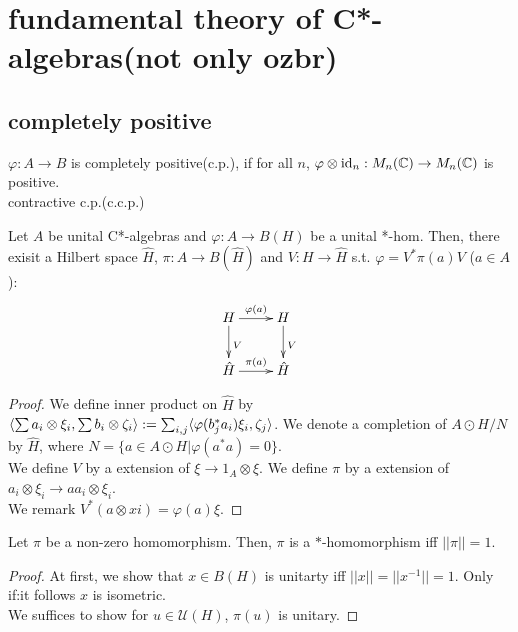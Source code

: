 \section{fundamental theory of C*-algebras(not only ozbr)}
\subsection{completely positive}
\begin{definition}
  $\varphi : A \rightarrow B$ is completely positive(c.p.), if for all $n$, $\varphi \otimes {\rm id}_n : M_n(\mathbb{C}) \rightarrow M_n(\mathbb{C})$ is positive. \\
  contractive c.p.(c.c.p.)
\end{definition}

\begin{theorem}
  Let $A$ be unital C*-algebras and $\varphi : A \rightarrow B(H)$ be a unital *-hom.
  Then, there exisit a Hilbert space $\hat{H}$, $\pi : A \rightarrow B(\hat{H})$ and $V : H \rightarrow \hat{H}$ s.t. $\varphi = V^* \pi(a) V$ ($ a \in A$):
    \[
  \xymatrix{
    H \ar[r]^{\varphi(a)} \ar[d]^V & H \ar[d]^V \\
    \hat{H} \ar[r]^{\pi(a)}& \hat{H}
  }
  \]
\end{theorem}

\begin{proof}
  We define inner product on $\hat{H}$ by $\langle \sum a_i \otimes \xi_i , \sum b_i \otimes \zeta_i\rangle := \sum_{i,j}\langle\varphi(b_j^*a_i)\xi_i,\zeta_j\rangle$.
  We denote a completion of $A \odot H / N$ by $\hat{H}$, where $N = \{a \in A\odot H | \varphi(a^*a)=0\}$. \\
  We define $V$ by a extension of $\xi \rightarrow  1_A \otimes \xi$. 
  We define $\pi$ by a extension of $a_i \otimes \xi_i \rightarrow aa_i \otimes \xi_i$. \\
  We remark $V^*(a \otimes xi) = \varphi(a)\xi$.
\end{proof}

\begin{proposition}
  Let $\pi$ be a non-zero homomorphism.
  Then, $\pi$ is a $*$-homomorphism iff $||\pi||=1$.
\end{proposition}

\begin{proof}
  At first, we show that $x \in B(H)$ is unitarty iff $||x|| = ||x^{-1}||=1$.
  Only if:it follows $x$ is isometric.\\
  We suffices to show for $u \in \mathcal{U}(H)$, $\pi(u)$ is unitary.
\end{proof}

